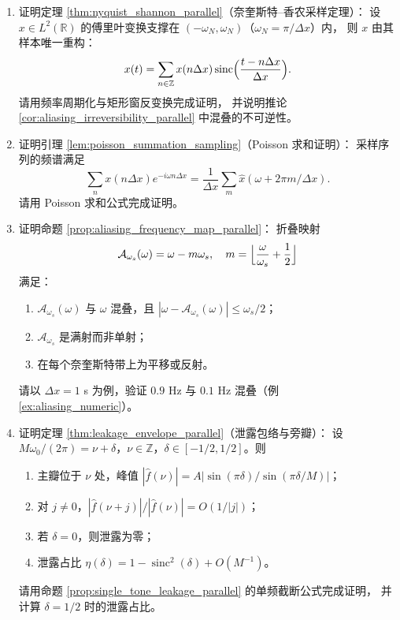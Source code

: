 \begin{enumerate}[leftmargin=3em, label=\textbf{题 \arabic*}]
    \item 证明定理 \ref{thm:nyquist_shannon_parallel}（奈奎斯特--香农采样定理）：
    设 $x\in L^2(\mathbb{R})$ 的傅里叶变换支撑在
    $(-\omega_N,\omega_N)$（$\omega_N=\pi/\Delta x$）内，
    则 $x$ 由其样本唯一重构：
    \[
    x(t)=\sum_{n\in\mathbb{Z}}x(n\Delta x)\operatorname{sinc}
    \Bigl(\frac{t-n\Delta x}{\Delta x}\Bigr).
    \]
    请用频率周期化与矩形窗反变换完成证明，
    并说明推论 \ref{cor:aliasing_irreversibility_parallel} 中混叠的不可逆性。

    \item 证明引理 \ref{lem:poisson_summation_sampling}（Poisson 求和证明）：
    采样序列的频谱满足
    \[
    \sum_{n}x(n\Delta x)e^{-i\omega n\Delta x}
    =\frac{1}{\Delta x}\sum_m\hat x(\omega+2\pi m/\Delta x).
    \]
    请用 Poisson 求和公式完成证明。

    \item 证明命题 \ref{prop:aliasing_frequency_map_parallel}：
    折叠映射
    \[
    \mathcal{A}_{\omega_s}(\omega)=\omega-m\omega_s,\quad
    m=\Bigl\lfloor\frac{\omega}{\omega_s}+\frac12\Bigr\rfloor
    \]
    满足：
    \begin{enumerate}[label=(\roman*)]
        \item $\mathcal{A}_{\omega_s}(\omega)$ 与 $\omega$ 混叠，且
              $|\omega-\mathcal{A}_{\omega_s}(\omega)|\le\omega_s/2$；
        \item $\mathcal{A}_{\omega_s}$ 是满射而非单射；
        \item 在每个奈奎斯特带上为平移或反射。
    \end{enumerate}
    请以 $\Delta x=1$ s 为例，验证 $0.9$ Hz 与 $0.1$ Hz 混叠（例 \ref{ex:aliasing_numeric}）。

    \item 证明定理 \ref{thm:leakage_envelope_parallel}（泄露包络与旁瓣）：
    设 $M\omega_0/(2\pi)=\nu+\delta$，$\nu\in\mathbb{Z}$，$\delta\in[-1/2,1/2]$。则
    \begin{enumerate}[label=(\roman*)]
        \item 主瓣位于 $\nu$ 处，峰值
              $|\hat{f}(\nu)|=A|\sin(\pi\delta)/\sin(\pi\delta/M)|$；
        \item 对 $j\ne0$，$|\hat{f}(\nu+j)|/|\hat{f}(\nu)|=O(1/|j|)$；
        \item 若 $\delta=0$，则泄露为零；
        \item 泄露占比 $\eta(\delta)=1-\operatorname{sinc}^2(\delta)+O(M^{-1})$。
    \end{enumerate}
    请用命题 \ref{prop:single_tone_leakage_parallel} 的单频截断公式完成证明，
    并计算 $\delta=1/2$ 时的泄露占比。


\end{enumerate}

